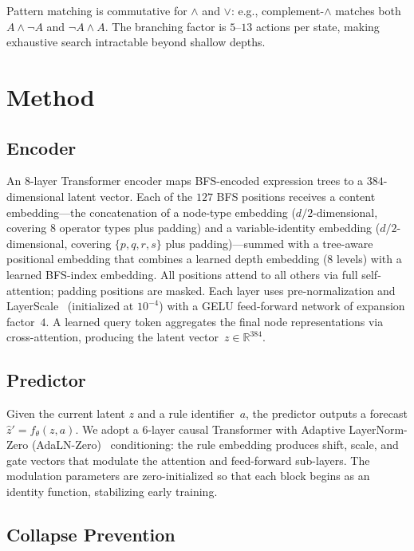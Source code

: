 \documentclass{article}
\begin{document}
Pattern matching is commutative for $\wedge$ and $\vee$: e.g.,
complement-$\wedge$ matches both $A \wedge \neg A$ and $\neg A \wedge A$.
The branching factor is $5$--$13$ actions per state, making exhaustive
search intractable beyond shallow depths.

\section{Method}

\subsection{Encoder}

An 8-layer Transformer encoder maps BFS-encoded expression trees to a
$384$-dimensional latent vector. Each of the $127$ BFS positions receives a
content embedding---the concatenation of a node-type embedding
($d/2$-dimensional, covering $8$ operator types plus padding) and a
variable-identity embedding ($d/2$-dimensional, covering $\{p,q,r,s\}$
plus padding)---summed with a tree-aware positional embedding that combines
a learned depth embedding ($8$ levels) with a learned BFS-index embedding.
All positions attend to all others via full self-attention; padding
positions are masked. Each layer uses pre-normalization and
LayerScale~\cite{touvron2021cait} (initialized at $10^{-4}$) with a GELU
feed-forward network of expansion factor~$4$. A learned query token
aggregates the final node representations via cross-attention, producing the
latent vector~$z \in \mathbb{R}^{384}$.

\subsection{Predictor}

Given the current latent $z$ and a rule identifier~$a$, the predictor
outputs a forecast $\hat{z}' = f_\theta(z, a)$. We adopt a $6$-layer
causal Transformer with Adaptive LayerNorm-Zero
(AdaLN-Zero)~\cite{peebles2023dit} conditioning: the rule embedding
produces shift, scale, and gate vectors that modulate the attention and
feed-forward sub-layers. The modulation parameters are zero-initialized so
that each block begins as an identity function, stabilizing early training.

\subsection{Collapse Prevention}
\end{document}
